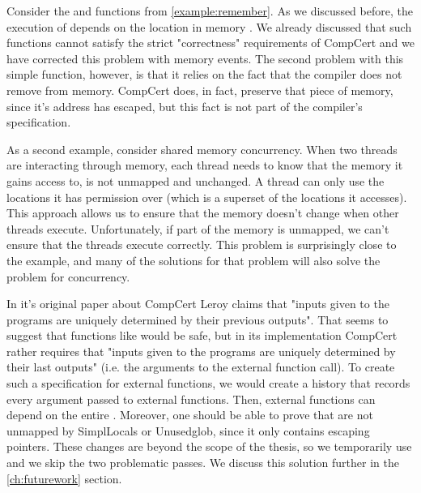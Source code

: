Consider the  and  functions from \ref{example:remember}. As we discussed before, the execution of  depends on the location in memory . We already discussed that such functions cannot satisfy the strict "correctness" requirements of CompCert and we have corrected this problem with memory events. The second problem with this simple function, however, is that it relies on the fact that the compiler does not remove  from memory. CompCert does, in fact, preserve that piece of memory, since it's address has escaped, but this fact is not part of the compiler's specification. 

As a second example, consider shared memory concurrency. When two threads are interacting through memory, each thread needs to know that the memory it gains access to, is not unmapped and unchanged. A thread can only use the locations it has permission over (which is a superset of the locations it accesses). This approach allows us to ensure that the memory doesn't change when other threads execute. Unfortunately, if part of the memory is unmapped, we can't ensure that the threads execute correctly. This problem is surprisingly close to the   example, and many of the solutions for that problem will also solve the problem for concurrency. 

In it's original paper about CompCert Leroy \cite{Leroy-Compcert-CACM} claims that "inputs given to the programs are uniquely determined by their previous outputs". That seems to suggest that functions like  would be safe, but in its implementation CompCert rather requires that "inputs given to the programs are uniquely determined by their last outputs" (i.e. the arguments to the external function call). To create such a specification for external functions, we would create a history  that records every argument passed to external functions. Then, external functions can depend on the entire . Moreover, one should be able to prove that  are not unmapped by SimplLocals or Unusedglob, since it only contains escaping pointers. These changes are beyond the scope of the thesis, so we temporarily use  and we skip the two problematic passes. We discuss this solution further in the \ref{ch:futurework} section.


